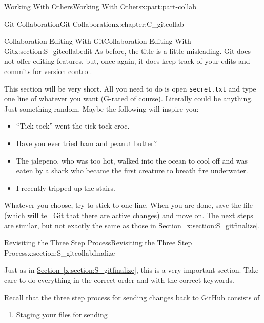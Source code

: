\documentclass[oneside,10pt,]{book}
\newcommand{\xreffont}{\relax}
\newcommand{\mono}[1]{\texttt{#1}}
\begin{document}
\begin{partptx}{Working With Others}{}{Working With Others}{}{}{x:part:part-collab}
\begin{chapterptx}{Git Collaboration}{}{Git Collaboration}{}{}{x:chapter:C_gitcollab}
\typeout{************************************************}
%
\begin{sectionptx}{Collaboration Editing With Git}{}{Collaboration Editing With Git}{}{}{x:section:S_gitcollabedit}
%
%
As before, the title is a little misleading. Git does not offer editing features, but, once again, it does keep track of your edits and commits for version control.%
\par
This section will be very short. All you need to do is open \mono{secret.txt} and type one line of whatever you want (G-rated of course). Literally could be anything. Just something random. Maybe the following will inspire you:%
\begin{itemize}[label=\textbullet]
\item{}``Tick tock'' went the tick tock croc.%
\item{}Have you ever tried ham and peanut butter?%
\item{}The jalepeno, who was too hot, walked into the ocean to cool off and was eaten by a shark who became the first creature to breath fire underwater.%
\item{}I recently tripped up the stairs.%
\end{itemize}
%
\par
Whatever you choose, try to stick to one line. When you are done, save the file (which will tell Git that there are active changes) and move on. The next steps are similar, but not exactly the same as those in \hyperref[x:section:S_gitfinalize]{Section~{\xreffont\ref{x:section:S_gitfinalize}}}.%
\end{sectionptx}
%
%
\typeout{************************************************}
\typeout{************************************************}
%
\begin{sectionptx}{Revisiting the Three Step Process}{}{Revisiting the Three Step Process}{}{}{x:section:S_gitcollabfinalize}
%
%
\begin{introduction}{}%
Just as in \hyperref[x:section:S_gitfinalize]{Section~{\xreffont\ref{x:section:S_gitfinalize}}}, this is a very important section. Take care to do everything in the correct order and with the correct keywords.%
\par
Recall that the three step process for sending changes back to GitHub consists of%
\begin{enumerate}
\item{}Staging your files for sending%

\end{enumerate}
\end{introduction}
\end{sectionptx}
\end{chapterptx}
\end{partptx}
\end{document}
